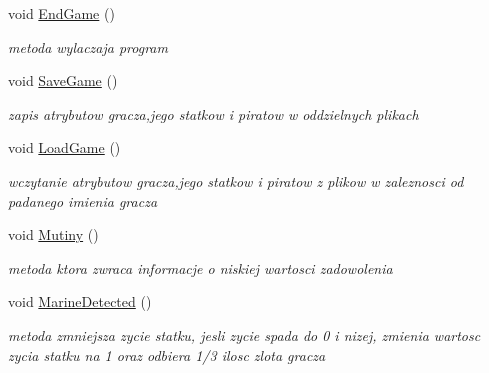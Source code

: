\begin{DoxyCompactItemize}
\mbox{\label{class_player_ae73a73ebaf54a546d29cd76e95df1d88}} 
void \hyperlink{class_player_ae73a73ebaf54a546d29cd76e95df1d88}{End\+Game} ()
\begin{DoxyCompactList}\small\item\em metoda wylaczaja program \end{DoxyCompactList}\item 
\mbox{\label{class_player_af3e4d935acf14a7f75af9e034c84c668}} 
void \hyperlink{class_player_af3e4d935acf14a7f75af9e034c84c668}{Save\+Game} ()
\begin{DoxyCompactList}\small\item\em zapis atrybutow gracza,jego statkow i piratow w oddzielnych plikach \end{DoxyCompactList}\item 
\mbox{\label{class_player_a8eaaa47114a8c0f3be2d81b3949ce728}} 
void \hyperlink{class_player_a8eaaa47114a8c0f3be2d81b3949ce728}{Load\+Game} ()
\begin{DoxyCompactList}\small\item\em wczytanie atrybutow gracza,jego statkow i piratow z plikow w zaleznosci od padanego imienia gracza \end{DoxyCompactList}\item 
\mbox{\label{class_player_a00d925d7fbf8af5eb7aaae82667d4968}} 
void \hyperlink{class_player_a00d925d7fbf8af5eb7aaae82667d4968}{Mutiny} ()
\begin{DoxyCompactList}\small\item\em metoda ktora zwraca informacje o niskiej wartosci zadowolenia \end{DoxyCompactList}\item 
\mbox{\label{class_player_a34f7b1e13c7b3a7bba123ab7bff1cfba}} 
void \hyperlink{class_player_a34f7b1e13c7b3a7bba123ab7bff1cfba}{Marine\+Detected} ()
\begin{DoxyCompactList}\small\item\em metoda zmniejsza zycie statku, jesli zycie spada do 0 i nizej, zmienia wartosc zycia statku na 1 oraz odbiera 1/3 ilosc zlota gracza \end{DoxyCompactList}\item 
\mbox{\label{class_player_af9a6045fa96f736664c4eab4caa5e8e5}} 

\end{DoxyCompactItemize}
